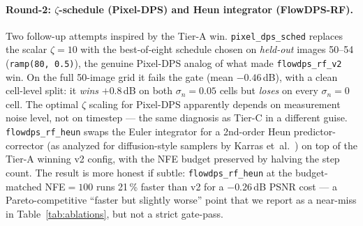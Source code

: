 \documentclass{article}
\begin{document}
\paragraph{Round-2: $\zeta$-schedule (Pixel-DPS) and Heun integrator (FlowDPS-RF).}
Two follow-up attempts inspired by the Tier-A win.
\texttt{pixel\_dps\_sched} replaces the scalar $\zeta{=}10$ with the
best-of-eight schedule chosen on \emph{held-out} images 50--54
(\texttt{ramp(80, 0.5)}), the genuine Pixel-DPS analog of what made
\texttt{flowdps\_rf\_v2} win. On the full 50-image grid it fails the
gate (mean $-0.46$\,dB), with a clean cell-level split: it
\emph{wins} ${+}0.8$\,dB on both $\sigma_n{=}0.05$ cells but
\emph{loses} on every $\sigma_n{=}0$ cell. The optimal $\zeta$
scaling for Pixel-DPS apparently depends on measurement noise level,
not on timestep --- the same diagnosis as Tier-C in a different guise.
\texttt{flowdps\_rf\_heun} swaps the Euler integrator for a 2nd-order
Heun predictor-corrector (as analyzed for diffusion-style samplers by
Karras et~al.~\cite{karras2022edm}) on top of the Tier-A winning v2 config, with
the NFE budget preserved by halving the step count. The result is
more honest if subtle: \texttt{flowdps\_rf\_heun} at the
budget-matched NFE${=}100$ runs 21\,\% faster than v2 for a
$-0.26$\,dB PSNR cost --- a Pareto-competitive ``faster but slightly
worse'' point that we report as a near-miss in
Table~\ref{tab:ablations}, but not a strict gate-pass.
\end{document}
